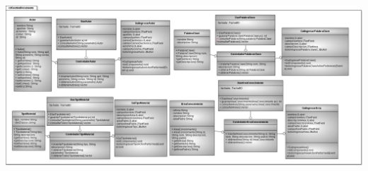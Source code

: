\documentclass[]{article}
\begin{document}
			\begin{minipage}[c]{1\linewidth}
				\centering
				\includegraphics[width=22cm, height=17cm,angle=90]{DiagramasClase/GestionDocumento}
			\end{minipage}	
		
\end{document}

